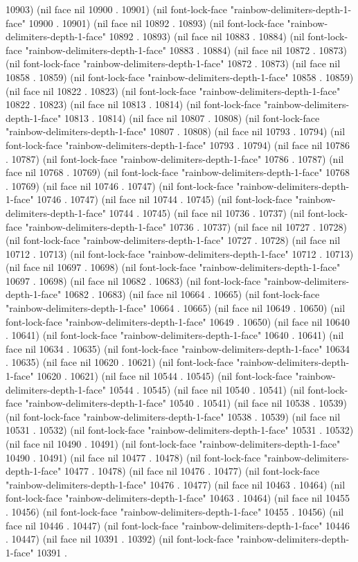 10903) (nil face nil 10900 . 10901) (nil font-lock-face "rainbow-delimiters-depth-1-face" 10900 . 10901) (nil face nil 10892 . 10893) (nil font-lock-face "rainbow-delimiters-depth-1-face" 10892 . 10893) (nil face nil 10883 . 10884) (nil font-lock-face "rainbow-delimiters-depth-1-face" 10883 . 10884) (nil face nil 10872 . 10873) (nil font-lock-face "rainbow-delimiters-depth-1-face" 10872 . 10873) (nil face nil 10858 . 10859) (nil font-lock-face "rainbow-delimiters-depth-1-face" 10858 . 10859) (nil face nil 10822 . 10823) (nil font-lock-face "rainbow-delimiters-depth-1-face" 10822 . 10823) (nil face nil 10813 . 10814) (nil font-lock-face "rainbow-delimiters-depth-1-face" 10813 . 10814) (nil face nil 10807 . 10808) (nil font-lock-face "rainbow-delimiters-depth-1-face" 10807 . 10808) (nil face nil 10793 . 10794) (nil font-lock-face "rainbow-delimiters-depth-1-face" 10793 . 10794) (nil face nil 10786 . 10787) (nil font-lock-face "rainbow-delimiters-depth-1-face" 10786 . 10787) (nil face nil 10768 . 10769) (nil font-lock-face "rainbow-delimiters-depth-1-face" 10768 . 10769) (nil face nil 10746 . 10747) (nil font-lock-face "rainbow-delimiters-depth-1-face" 10746 . 10747) (nil face nil 10744 . 10745) (nil font-lock-face "rainbow-delimiters-depth-1-face" 10744 . 10745) (nil face nil 10736 . 10737) (nil font-lock-face "rainbow-delimiters-depth-1-face" 10736 . 10737) (nil face nil 10727 . 10728) (nil font-lock-face "rainbow-delimiters-depth-1-face" 10727 . 10728) (nil face nil 10712 . 10713) (nil font-lock-face "rainbow-delimiters-depth-1-face" 10712 . 10713) (nil face nil 10697 . 10698) (nil font-lock-face "rainbow-delimiters-depth-1-face" 10697 . 10698) (nil face nil 10682 . 10683) (nil font-lock-face "rainbow-delimiters-depth-1-face" 10682 . 10683) (nil face nil 10664 . 10665) (nil font-lock-face "rainbow-delimiters-depth-1-face" 10664 . 10665) (nil face nil 10649 . 10650) (nil font-lock-face "rainbow-delimiters-depth-1-face" 10649 . 10650) (nil face nil 10640 . 10641) (nil font-lock-face "rainbow-delimiters-depth-1-face" 10640 . 10641) (nil face nil 10634 . 10635) (nil font-lock-face "rainbow-delimiters-depth-1-face" 10634 . 10635) (nil face nil 10620 . 10621) (nil font-lock-face "rainbow-delimiters-depth-1-face" 10620 . 10621) (nil face nil 10544 . 10545) (nil font-lock-face "rainbow-delimiters-depth-1-face" 10544 . 10545) (nil face nil 10540 . 10541) (nil font-lock-face "rainbow-delimiters-depth-1-face" 10540 . 10541) (nil face nil 10538 . 10539) (nil font-lock-face "rainbow-delimiters-depth-1-face" 10538 . 10539) (nil face nil 10531 . 10532) (nil font-lock-face "rainbow-delimiters-depth-1-face" 10531 . 10532) (nil face nil 10490 . 10491) (nil font-lock-face "rainbow-delimiters-depth-1-face" 10490 . 10491) (nil face nil 10477 . 10478) (nil font-lock-face "rainbow-delimiters-depth-1-face" 10477 . 10478) (nil face nil 10476 . 10477) (nil font-lock-face "rainbow-delimiters-depth-1-face" 10476 . 10477) (nil face nil 10463 . 10464) (nil font-lock-face "rainbow-delimiters-depth-1-face" 10463 . 10464) (nil face nil 10455 . 10456) (nil font-lock-face "rainbow-delimiters-depth-1-face" 10455 . 10456) (nil face nil 10446 . 10447) (nil font-lock-face "rainbow-delimiters-depth-1-face" 10446 . 10447) (nil face nil 10391 . 10392) (nil font-lock-face "rainbow-delimiters-depth-1-face" 10391 . 